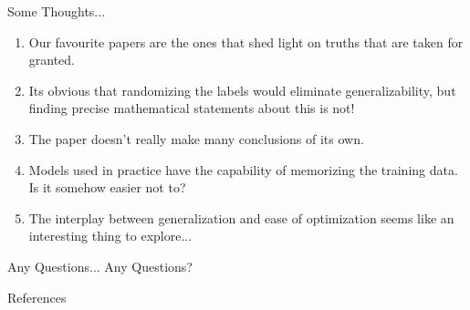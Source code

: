 \documentclass[10pt]{beamer}
\begin{document}
\begin{frame}{Some Thoughts... }
	\begin{enumerate}
		\item Our favourite papers are the ones that shed light on truths that are taken for granted.
		\item Its obvious that randomizing the labels would eliminate generalizability, but finding precise mathematical statements about this is not!
		\item The paper doesn't really make many conclusions of its own.
		\item Models used in practice have the capability of memorizing the training data. Is it somehow easier not to?
		\item The interplay between generalization and ease of optimization seems like an interesting thing to explore...
	\end{enumerate}

	
	
\end{frame}	

\begin{frame}{Any Questions... }
Any Questions?
\end{frame}	

\begin{frame}{References}


\end{frame}	
	
\end{document}
